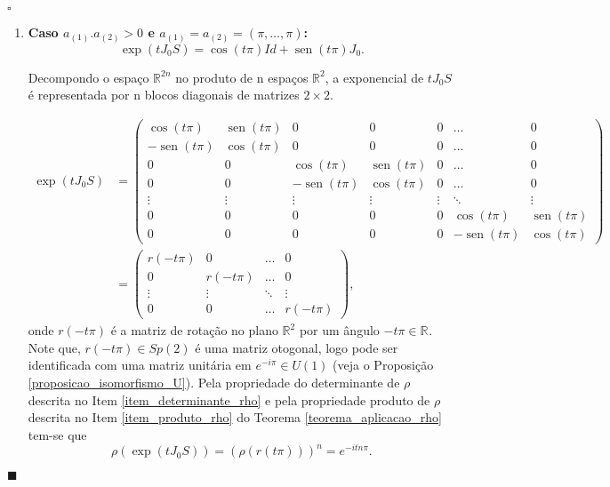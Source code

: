 \documentclass[12pt]{book}
\newenvironment{prova}[1]{$\square$ #1}{\hfill$\blacksquare$}
\DeclareMathOperator{\sen}{sen}
\newcommand{\estruturacomplexa}{J_{0}}
\newcommand{\gruposimpletico}[1]{Sp(#1)}
\newcommand{\real}[1]{\mathbb{R}^{#1}}
\newcommand{\reta}{\real{}}
\begin{document}
\begin{prova}
\begin{enumerate}
			\begin{enumerate}
				\item \textbf{Caso $a_{(1)}.a_{(2)}>0$ e $a_{(1)} = a_{(2)} = (\pi,\dots,\pi)$:}
				$$
				\exp(t\estruturacomplexa S) 
				= 
				\cos(t\pi)Id+ \sen(t\pi)\estruturacomplexa.
				$$
				
				Decompondo o espaço $\real{2n}$ no produto de n espaços $\real{2}$, a exponencial de $t\estruturacomplexa S$ é representada por n blocos diagonais de matrizes $2\times 2$.
				
				$$
				\begin{aligned}
					\exp(t\estruturacomplexa S) 
					&=
					\left(
					\begin{array}{ccccccc}
					\cos(t\pi) & \sen(t\pi) & 0 & 0 & 0 & \dots & 0
					\\
					-\sen(t\pi) & \cos(t\pi) & 0 & 0 & 0 & \dots & 0  
					\\
					0 & 0 & \cos(t\pi) & \sen(t\pi) & 0 & \dots & 0
					\\
					0 & 0 & -\sen(t\pi) & \cos(t\pi) & 0 & \dots & 0
					\\
					\vdots & \vdots & \vdots & \vdots & \vdots & \ddots & \vdots
					\\
					0 & 0 & 0 & 0 & 0 & \cos(t\pi) & \sen(t\pi)
					\\
					0 & 0 & 0 & 0 & 0 & -\sen(t\pi) & \cos(t\pi)
					\end{array}
					\right)
					\\
					&=
					\left(
					\begin{array}{ccccc}
					r(-t\pi) & 0 &\dots & 0 
					\\
					0 & r(-t\pi) &\dots & 0 
					\\
					\vdots & \vdots & \ddots & \vdots 
					\\
					0 & 0 & \dots & r(-t\pi)
					\end{array}
					\right),
				\end{aligned}
				$$
				onde $r(-t\pi)$ é a matriz de rotação no plano $\real{2}$ por um ângulo $-t\pi \in \reta$. Note que, $r(-t\pi) \in \gruposimpletico{2}$ é uma matriz otogonal, logo pode ser identificada com uma matriz unitária em $e^{-i\pi}\in U(1)$ (veja o Proposição \ref{proposicao_isomorfismo_U}). Pela propriedade do determinante de $\rho$ descrita no Item \ref{item_determinante_rho} e pela propriedade produto de $\rho$ descrita no Item \ref{item_produto_rho} do Teorema \ref{teorema_aplicacao_rho} tem-se que 
				$$
				\rho(\exp(t\estruturacomplexa S)) = (\rho(r(t\pi)))^{n} = e^{-itn\pi}.
				$$ 
				

\end{enumerate}
\end{enumerate}
\end{prova}
\end{document}
